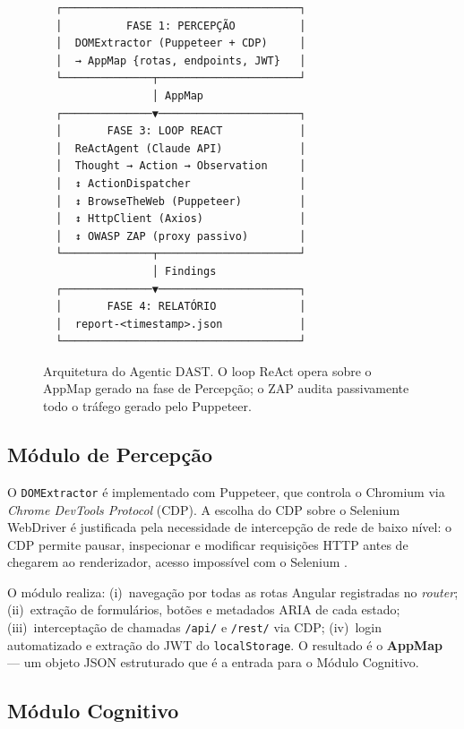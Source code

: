 \documentclass[
    10pt,
    twocolumn,
    a4paper
]{article}
\begin{document}
\begin{figure}[!htb]
\centering
\small
\begin{verbatim}
  ┌─────────────────────────────────────┐
  │          FASE 1: PERCEPÇÃO          │
  │  DOMExtractor (Puppeteer + CDP)     │
  │  → AppMap {rotas, endpoints, JWT}   │
  └──────────────┬──────────────────────┘
                 │ AppMap
  ┌──────────────▼──────────────────────┐
  │       FASE 3: LOOP REACT            │
  │  ReActAgent (Claude API)            │
  │  Thought → Action → Observation     │
  │  ↕ ActionDispatcher                 │
  │  ↕ BrowseTheWeb (Puppeteer)         │
  │  ↕ HttpClient (Axios)               │
  │  ↕ OWASP ZAP (proxy passivo)        │
  └──────────────┬──────────────────────┘
                 │ Findings
  ┌──────────────▼──────────────────────┐
  │       FASE 4: RELATÓRIO             │
  │  report-<timestamp>.json            │
  └─────────────────────────────────────┘
\end{verbatim}
\caption{Arquitetura do Agentic DAST. O loop ReAct opera sobre o
AppMap gerado na fase de Percepção; o ZAP audita passivamente todo
o tráfego gerado pelo Puppeteer.}
\label{fig:arquitetura}
\end{figure}

\subsection{Módulo de Percepção}

O \texttt{DOMExtractor} é implementado com Puppeteer, que controla o
Chromium via \textit{Chrome DevTools Protocol} (CDP). A escolha do CDP
sobre o Selenium WebDriver é justificada pela necessidade de
intercepção de rede de baixo nível: o CDP permite pausar, inspecionar
e modificar requisições HTTP antes de chegarem ao renderizador, acesso
impossível com o Selenium \cite{lightpanda2024}.

O módulo realiza: (i)~navegação por todas as rotas Angular registradas
no \textit{router}; (ii)~extração de formulários, botões e
metadados ARIA de cada estado; (iii)~interceptação de chamadas
\texttt{/api/} e \texttt{/rest/} via CDP; (iv)~login automatizado
e extração do JWT do \texttt{localStorage}. O resultado é o
\textbf{AppMap} --- um objeto JSON estruturado que é a entrada para
o Módulo Cognitivo.

\subsection{Módulo Cognitivo}
\end{document}
